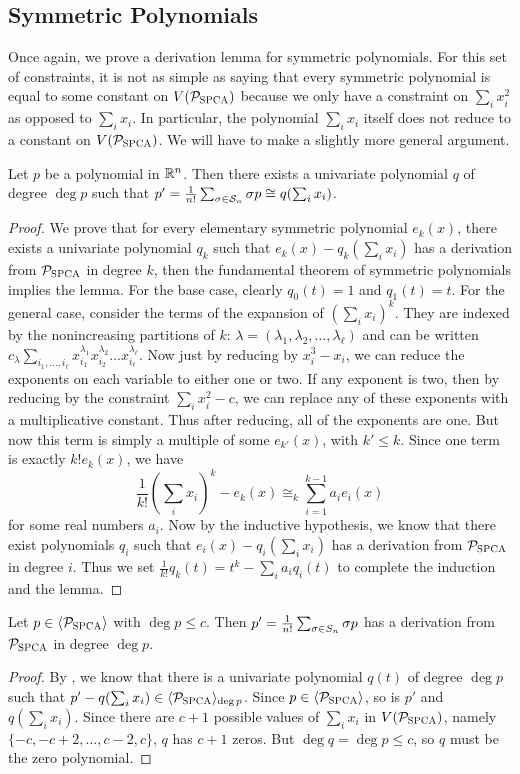 \subsection{Symmetric Polynomials}
Once again, we prove a derivation lemma for symmetric polynomials. For this set of constraints, it is not as simple as saying that every symmetric polynomial is equal to some constant on $V(\mathcal P_{\textsc{SPCA}})$ because we only have a constraint on $\sum_i x_i^2$ as opposed to $\sum_i x_i$. In particular, the polynomial $\sum_i x_i$ itself does not reduce to a constant on $V(\mathcal P_{\textsc{SPCA}})$. We will have to make a slightly more general argument.
\begin{lemma}\label{lem:bpca-symmetric}
Let $p$ be a polynomial in $\mathbb R^n$. Then there exists a univariate polynomial $q$ of degree $\deg p$ such that $p' = \frac{1}{n!}\sum_{\sigma \in \mathcal S_n} \sigma p \cong q(\sum_i x_i)$.
\end{lemma}
\begin{proof}
We prove that for every elementary symmetric polynomial $e_k(x)$, there exists a univariate polynomial $q_k$ such that $e_k(x) - q_k(\sum_i x_i)$ has a derivation from $\mathcal P_{\textsc{SPCA}}$ in degree $k$, then the fundamental theorem of symmetric polynomials implies the lemma. For the base case, clearly $q_0(t) = 1$ and $q_1(t) = t$. For the general case, consider the terms of the expansion of $\left(\sum_i x_i\right)^k$. They are indexed by the nonincreasing partitions of $k$: $\lambda = (\lambda_1, \lambda_2, \dots, \lambda_\ell)$ and can be written $c_\lambda \sum_{i_1,\dots,i_\ell} x_{i_1}^{\lambda_1} x_{i_2}^{\lambda_2} \dots x_{i_\ell}^{\lambda_\ell}$. Now just by reducing by $x_i^3 - x_i$, we can reduce the exponents on each variable to either one or two. If any exponent is two, then by reducing by the constraint $\sum_i x_i^2 - c$, we can replace any of these exponents with a multiplicative constant. Thus after reducing, all of the exponents are one. But now this term is simply a multiple of some $e_{k'}(x)$, with $k' \leq k$. Since one term is exactly $k!e_k(x)$, we have
\[\frac{1}{k!}\left(\sum_i x_i\right)^k - e_k(x) \cong_k \sum_{i=1}^{k-1} a_i e_i(x)\]
for some real numbers $a_i$. Now by the inductive hypothesis, we know that there exist polynomials $q_i$ such that $e_i(x) - q_i(\sum_i x_i)$ has a derivation from $\mathcal P_{\textsc{SPCA}}$ in degree $i$. Thus we set $\frac{1}{k!}q_k(t) = t^k - \sum_i a_i q_i(t)$ to complete the induction and the lemma.
\end{proof}
\begin{corollary}
Let $p \in \langle \mathcal P_{\textsc{SPCA}} \rangle$ with $\deg p \leq c$. Then $p' = \frac{1}{n!}\sum_{\sigma \in S_{n}} \sigma p$ has a derivation from $\mathcal P_{\textsc{SPCA}}$ in degree $\deg p$. 
\end{corollary}
\begin{proof}
By , we know that there is a univariate polynomial $q(t)$ of degree $\deg p$ such that $p' - q(\sum_i x_i) \in \langle \mathcal P_{\textsc{SPCA}} \rangle_{\deg p}$. Since $p \in \langle \mathcal P_{\textsc{SPCA}} \rangle$, so is $p'$ and $q(\sum_i x_i)$. Since there are $c+1$ possible values of $\sum_i x_i$ in $V(\mathcal P_{\textsc{SPCA}})$, namely $\{-c, -c+2, \dots, c-2, c\}$, $q$ has $c+1$ zeros. But $\deg q = \deg p \leq c$, so $q$ must be the zero polynomial.
\end{proof}

